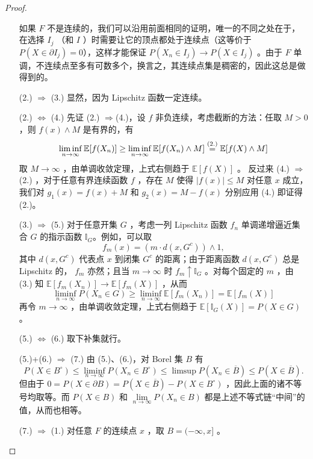 \begin{proof}
\begin{itemize}[leftmargin=3cm]
如果 $F$ 不是连续的，我们可以沿用前面相同的证明，唯一的不同之处在于，在选择 $I_j$ （和 $I$ ）时需要让它的顶点都处于连续点（这等价于 $P(X\in \partial I_j)=0$），这样才能保证 $P(X_n\in I_j)\to P(X\in I_j)$ 。由于 $F$ 单调，不连续点至多有可数多个，换言之，其连续点集是稠密的，因此这总是做得到的。

\item[(2.) $\Rightarrow$ (3.)] 显然，因为 Lipschitz 函数一定连续。
\item[(2.) $\Leftrightarrow$ (4.) ] 先证 (2.) $\Rightarrow$(4.)，设 $f$ 非负连续，考虑截断的方法：任取 $M>0$ ，则 $f(x)\wedge M$ 是有界的，有 \[ \liminf_{n\to\infty}\mathbb{E}[f(X_n)]\ge \liminf_{n\to\infty}\mathbb{E}[f(X_n)\wedge M]\overset{\text(2.)}{=}\mathbb{E}[f(X)\wedge M] \]取 $M\to\infty$ ，由单调收敛定理，上式右侧趋于 $\mathbb{E}[f(X)]$ 。
反过来 (4.) $\Rightarrow$ (2.) ，对于任意有界连续函数 $f$ ，存在 $M$ 使得 $|f(x)|\le M$ 对任意 $x$ 成立，我们对 $g_1(x)=f(x)+M$ 和 $g_2(x)=M-f(x)$ 分别应用 (4.) 即证得 (2.)。

\item[(3.) $\Rightarrow$ (5.)] 对于任意开集 $G$ ，考虑一列 Lipschitz 函数 $f_n$ 单调递增逼近集合 $G$ 的指示函数 $\mathbb{I}_G$。例如，可以取
\[
f_m(x) = (m \cdot d(x, G^c)) \wedge 1,
\]
其中 $d(x,G^c)$ 代表点 $x$ 到闭集 $G^c$ 的距离；由于距离函数 $d(x,G^c)$ 总是 Lipschitz 的， $f_m$ 亦然；且当 $m\to\infty$ 时 $f_m\uparrow \mathbb I_G$ 。对每个固定的 $m$ ，由 (3.) 知 $\mathbb{E}[f_m(X_n)] \to \mathbb{E}[f_m(X)]$ ，从而 \[ \liminf_{n \to \infty} P(X_n \in G) \ge \liminf_{n \to \infty} \mathbb{E}[f_m(X_n)] = \mathbb{E}[f_m(X)] \]再令 $m\to\infty$ ，由单调收敛定理，上式右侧趋于 $\mathbb{E}[\mathbb I_G(X)] = P(X \in G)$ 。

\item[(5.) $\Leftrightarrow$ (6.)] 取下补集就行。
\item[(5.)+(6.) $\Rightarrow$ (7.) ] 由 (5.)、(6.)，对 Borel 集 $B$ 有
\[
P(X\in B^\circ)\le\liminf_{n\to\infty}P(X_n\in B^\circ)\le \limsup P(X_n\in \overline B)\le P(X\in\overline B).
\]
但由于 $0=P(X\in\partial B)=P(X\in\overline B)-P(X\in B^\circ)$ ，因此上面的诸不等号均取等。而 $P(X\in B)$ 和 $\lim\limits_{n\to\infty}P(X_n\in B)$ 都是上述不等式链``中间''的值，从而也相等。

\item[(7.) $\Rightarrow$ (1.)] 对任意 $F$ 的连续点 $x$ ，取 $B=(-\infty ,x]$ 。
\end{itemize}

\end{proof}

